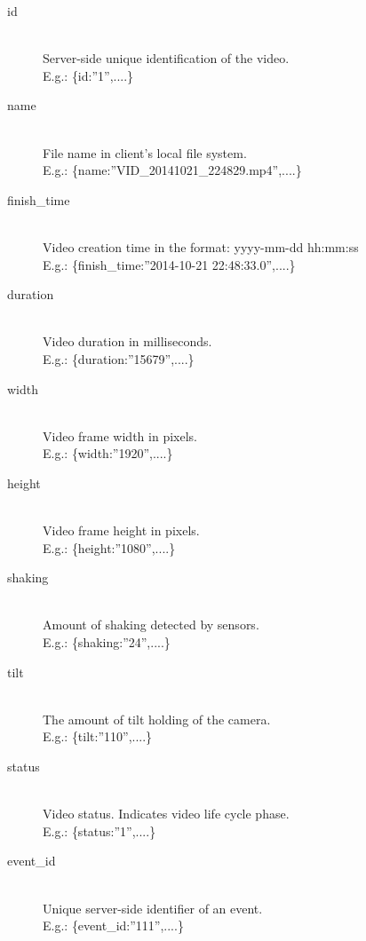 \documentclass[conference]{IEEEtran}
\begin{document}
\begin{description}
	\item[id] \hfill\\
		Server-side unique identification of the video. \hfill\\ E.g.: {\{id:”1”,....\}}

	\item[name]\hfill\\
		File name in client's local file system. \hfill\\ E.g.: {\{name:”VID\_20141021\_224829.mp4”,....\}}
		
	\item[finish\_time]\hfill\\
		Video creation time in the format: yyyy-mm-dd hh:mm:ss \hfill\\ E.g.: {\{finish\_time:”2014-10-21 22:48:33.0”,....\}}

	\item[duration]\hfill\\
		Video duration in milliseconds. \hfill\\ E.g.: {\{duration:”15679”,....\}}
		
	\item[width]\hfill\\
		Video frame width in pixels. \hfill\\ E.g.: {\{width:”1920”,....\}}

	\item[height]\hfill\\
		Video frame height in pixels. \hfill\\ E.g.: {\{height:”1080”,....\}}	 
	
	\item[shaking]\hfill\\
		Amount of shaking detected by sensors. \hfill\\ E.g.: {\{shaking:”24”,....\}}

	\item[tilt]\hfill\\
		The amount of tilt holding of the camera. \hfill\\ E.g.: {\{tilt:”110”,....\}}
	
	\item[status]\hfill\\
		Video status. Indicates video life cycle phase. \hfill\\ E.g.: {\{status:”1”,....\}}

	\item[event\_id]\hfill\\
		Unique server-side identifier of an event. \hfill\\ E.g.: {\{event\_id:”111”,....\}}
		
\end{description}
\end{document}
